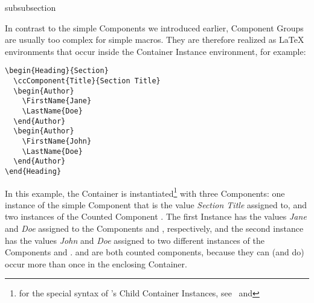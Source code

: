 \begin{Heading}{subsubsection}
\end{Heading}

In contrast to the simple Components we introduced earlier, Component
Groups are usually too complex for simple macros. They are therefore
realized as {\LaTeX} environments that occur inside the Container
Instance environment, for example:
\begin{lstlisting}[style=tex]
\begin{Heading}{Section}
  \ccComponent{Title}{Section Title}
  \begin{Author}
    \FirstName{Jane}
    \LastName{Doe}
  \end{Author}
  \begin{Author}
    \FirstName{John}
    \LastName{Doe}
  \end{Author}
\end{Heading}
\end{lstlisting}
In this example, the Container  is
instantiated\footnote{for the special syntax of
  's Child Container Instances,
  see~ and } with
three Components: one instance of the simple Component
 that is the value \textit{Section Title}
assigned to, and two instances of the Counted Component
. The first Instance has the values
\textit{Jane} and \textit{Doe} assigned to the Components
 and ,
respectively, and the second instance has the values \textit{John} and
\textit{Doe} assigned to two different instances of the Components
 and
.  and
 are both counted components, because they
can (and do) occur more than once in the enclosing Container.


